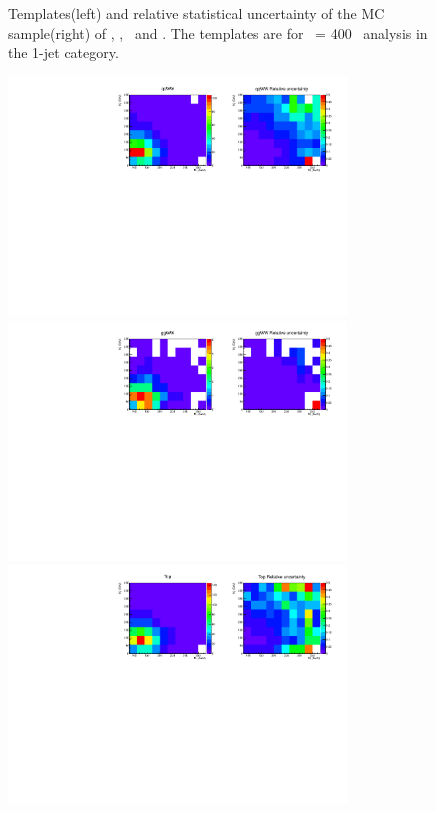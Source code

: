 \begin{figure}[htp]
\caption{Templates(left) and relative statistical uncertainty of the MC sample(right) 
of \qqWH, \qqZH, \qqH\ and \ggH. 
The templates are for \mHi\ = 400 \GeV\ analysis in the 1-jet category.}
\label{fig:2dtemplate_400_1j_1}
\end{figure}

\begin{figure}[htp]
\centering
\includegraphics[width=0.8\textwidth]{figures/2dtemplate_qqWW_mH400_1j.pdf}
\includegraphics[width=0.8\textwidth]{figures/2dtemplate_ggWW_mH400_1j.pdf}
\includegraphics[width=0.8\textwidth]{figures/2dtemplate_Top_mH400_1j.pdf}

\end{figure}
